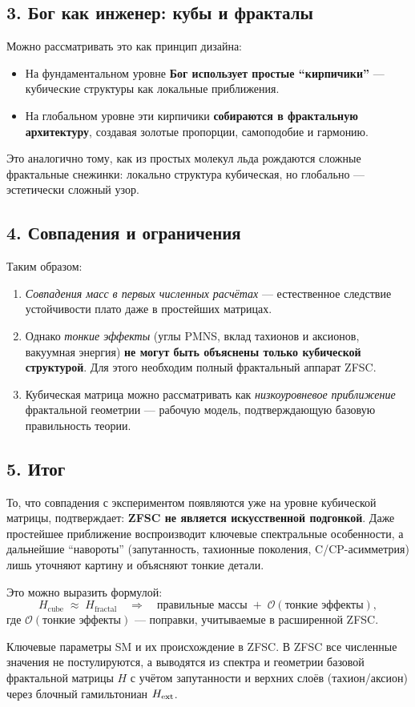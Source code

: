 \begin{table}[h!]
\subsection*{3. Бог как инженер: кубы и фракталы}
Можно рассматривать это как принцип дизайна:
\begin{itemize}
  \item На фундаментальном уровне \textbf{Бог использует простые ``кирпичики''} --- кубические структуры как локальные приближения.
  \item На глобальном уровне эти кирпичики \textbf{собираются в фрактальную архитектуру}, создавая золотые пропорции, самоподобие и гармонию.
\end{itemize}
Это аналогично тому, как из простых молекул льда рождаются сложные фрактальные снежинки: локально структура кубическая, но глобально --- эстетически сложный узор.

\subsection*{4. Совпадения и ограничения}
Таким образом:
\begin{enumerate}
  \item \emph{Совпадения масс в первых численных расчётах} --- естественное следствие устойчивости плато даже в простейших матрицах.
  \item Однако \emph{тонкие эффекты} (углы PMNS, вклад тахионов и аксионов, вакуумная энергия) \textbf{не могут быть объяснены только кубической структурой}. Для этого необходим полный фрактальный аппарат ZFSC.
  \item Кубическая матрица можно рассматривать как \emph{низкоуровневое приближение} фрактальной геометрии --- рабочую модель, подтверждающую базовую правильность теории.
\end{enumerate}

\subsection*{5. Итог}
То, что совпадения с экспериментом появляются уже на уровне кубической матрицы, подтверждает: \textbf{ZFSC не является искусственной подгонкой}. Даже простейшее приближение воспроизводит ключевые спектральные особенности, а дальнейшие ``навороты'' (запутанность, тахионные поколения, C/CP-асимметрия) лишь уточняют картину и объясняют тонкие детали.

Это можно выразить формулой:
\[
H_{\text{cube}} \;\approx\; H_{\text{fractal}} \quad \Rightarrow \quad
\text{правильные массы} \;+\; \mathcal{O}(\text{тонкие эффекты}),
\]
где $\mathcal{O}(\text{тонкие эффекты})$ — поправки, учитываемые в расширенной ZFSC.

\caption{Ключевые параметры SM и их происхождение в ZFSC. В ZFSC все численные значения не постулируются, а выводятся из спектра и геометрии базовой фрактальной матрицы $H$ с учётом запутанности и верхних слоёв (тахион/аксион) через блочный гамильтониан $H_{\rm ext}$.}
\end{table}
